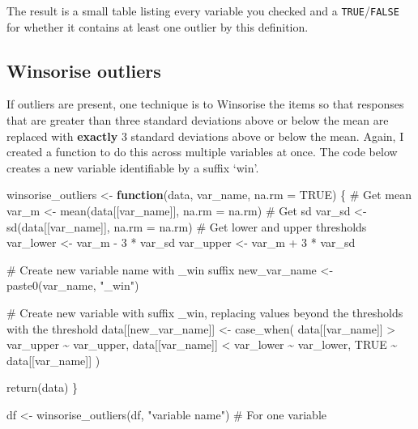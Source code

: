 \documentclass[
  letterpaper,
  DIV=11,
  numbers=noendperiod]{scrreprt}
\newenvironment{Shaded}{\begin{snugshade}}{\end{snugshade}}
\newcommand{\AttributeTok}[1]{\textcolor[rgb]{0.40,0.45,0.13}{#1}}
\newcommand{\CommentTok}[1]{\textcolor[rgb]{0.37,0.37,0.37}{#1}}
\newcommand{\ConstantTok}[1]{\textcolor[rgb]{0.56,0.35,0.01}{#1}}
\newcommand{\ControlFlowTok}[1]{\textcolor[rgb]{0.00,0.23,0.31}{\textbf{#1}}}
\newcommand{\DecValTok}[1]{\textcolor[rgb]{0.68,0.00,0.00}{#1}}
\newcommand{\FunctionTok}[1]{\textcolor[rgb]{0.28,0.35,0.67}{#1}}
\newcommand{\NormalTok}[1]{\textcolor[rgb]{0.00,0.23,0.31}{#1}}
\newcommand{\OtherTok}[1]{\textcolor[rgb]{0.00,0.23,0.31}{#1}}
\newcommand{\SpecialCharTok}[1]{\textcolor[rgb]{0.37,0.37,0.37}{#1}}
\newcommand{\StringTok}[1]{\textcolor[rgb]{0.13,0.47,0.30}{#1}}
\begin{document}
The result is a small table listing every variable you checked and a
\texttt{TRUE}/\texttt{FALSE} for whether it contains at least one
outlier by this definition.

\subsection{Winsorise outliers}\label{winsorise-outliers}

If outliers are present, one technique is to Winsorise the items so that
responses that are greater than three standard deviations above or below
the mean are replaced with \textbf{exactly} 3 standard deviations above
or below the mean. Again, I created a function to do this across
multiple variables at once. The code below creates a new variable
identifiable by a suffix `win'.

\begin{Shaded}
\begin{Highlighting}[]
\NormalTok{winsorise\_outliers }\OtherTok{\textless{}{-}} \ControlFlowTok{function}\NormalTok{(data, var\_name, }\AttributeTok{na.rm =} \ConstantTok{TRUE}\NormalTok{) \{}
  \CommentTok{\# Get mean}
\NormalTok{  var\_m }\OtherTok{\textless{}{-}} \FunctionTok{mean}\NormalTok{(data[[var\_name]], }\AttributeTok{na.rm =}\NormalTok{ na.rm)}
  \CommentTok{\# Get sd}
\NormalTok{  var\_sd }\OtherTok{\textless{}{-}} \FunctionTok{sd}\NormalTok{(data[[var\_name]], }\AttributeTok{na.rm =}\NormalTok{ na.rm)}
  \CommentTok{\# Get lower and upper thresholds}
\NormalTok{  var\_lower }\OtherTok{\textless{}{-}}\NormalTok{ var\_m }\SpecialCharTok{{-}} \DecValTok{3} \SpecialCharTok{*}\NormalTok{ var\_sd}
\NormalTok{  var\_upper }\OtherTok{\textless{}{-}}\NormalTok{ var\_m }\SpecialCharTok{+} \DecValTok{3} \SpecialCharTok{*}\NormalTok{ var\_sd}
  
  \CommentTok{\# Create new variable name with \_win suffix}
\NormalTok{  new\_var\_name }\OtherTok{\textless{}{-}} \FunctionTok{paste0}\NormalTok{(var\_name, }\StringTok{"\_win"}\NormalTok{)}
  
  \CommentTok{\# Create new variable with suffix \_win, replacing values beyond the thresholds with the threshold}
\NormalTok{  data[[new\_var\_name]] }\OtherTok{\textless{}{-}} \FunctionTok{case\_when}\NormalTok{(}
\NormalTok{    data[[var\_name]] }\SpecialCharTok{\textgreater{}}\NormalTok{ var\_upper }\SpecialCharTok{\textasciitilde{}}\NormalTok{ var\_upper,}
\NormalTok{    data[[var\_name]] }\SpecialCharTok{\textless{}}\NormalTok{ var\_lower }\SpecialCharTok{\textasciitilde{}}\NormalTok{ var\_lower,}
    \ConstantTok{TRUE} \SpecialCharTok{\textasciitilde{}}\NormalTok{ data[[var\_name]]}
\NormalTok{  )}
  
  \FunctionTok{return}\NormalTok{(data)}
\NormalTok{\}}

\NormalTok{df }\OtherTok{\textless{}{-}} \FunctionTok{winsorise\_outliers}\NormalTok{(df, }\StringTok{"variable name"}\NormalTok{) }\CommentTok{\# For one variable}
\end{Highlighting}
\end{Shaded}
\end{document}
